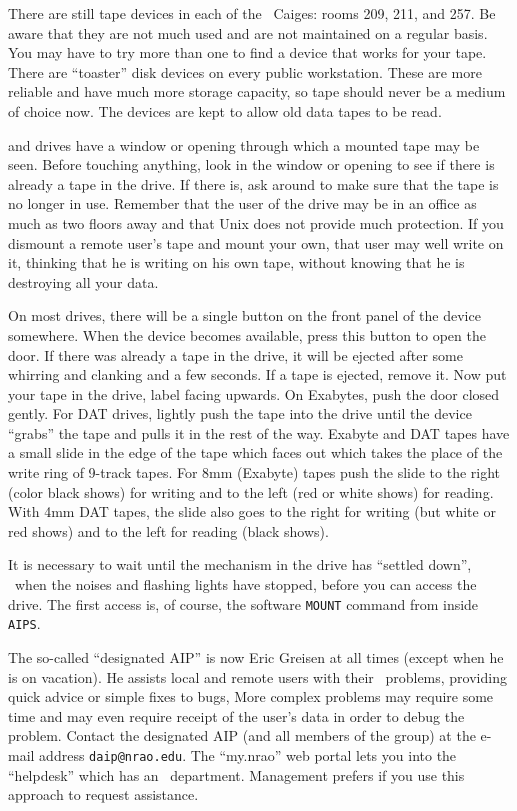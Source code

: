      There are still tape devices in each of the \AIPS\ Caiges: rooms
209, 211, and 257.  Be aware that they are not much used and are not
maintained on a regular basis.  You may have to try more than one to
find a device that works for your tape.  There are ``toaster'' disk
devices on every public workstation.  These are more reliable and have
much more storage capacity, so tape should never be a medium of choice
now.  The devices are kept to allow old data tapes to be read.

      and  drives have a window or
opening through which a mounted tape may be seen.  Before touching
anything, look in the window or opening to see if there is already a
tape in the drive.  If there is, ask around to make sure that the tape
is no longer in use.  Remember that the user of the drive may be in an
office as much as two floors away and that Unix does not provide much
protection.  If you dismount a remote user's tape and mount your own,
that user may well write on it, thinking that he is writing on his own
tape, without knowing that he is destroying all your data.

     On most drives, there will be a single button on the front panel
of the device somewhere.  When the device becomes available, press
this button to open the door.  If there was already a tape in the
drive, it will be ejected after some whirring and clanking and a few
seconds.  If a tape is ejected, remove it.  Now put your tape in the
drive, label facing upwards.  On Exabytes, push the door closed
gently.  For DAT drives, lightly push the tape into the drive until
the device ``grabs'' the tape and pulls it in the rest of the way.
Exabyte and DAT tapes have a small slide in the edge of the tape which
faces out which takes the place of the write ring of 9-track tapes.
For 8mm (Exabyte) tapes push the slide to the right (color black
shows) for writing and to the left (red or white shows) for reading.
With 4mm DAT tapes, the slide also goes to the right for writing (but
white or red shows) and to the left for reading (black shows).

     It is necessary to wait until the mechanism in the drive has
``settled down'', \ie\ when the noises and flashing lights have stopped,
before you can access the drive.  The first access is, of course, the
software {\tt MOUNT} command from inside \hbox{{\tt AIPS}}.


The so-called ``designated AIP'' is now Eric Greisen at all times
(except when he is on vacation).  He assists local and remote users
with their \AIPS\ problems, providing quick advice or simple fixes to
bugs,  More complex problems may require some time and may even require
receipt of the user's data in order to debug the problem.  Contact
the designated AIP (and all members of the group) at the e-mail
address {\tt daip@nrao.edu}.  The ``my.nrao'' web portal lets you into
the ``helpdesk'' which has an \AIPS\ department.  Management prefers
if you use this approach to request assistance.

